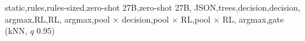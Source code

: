 {static},{rules},{rules-sized},{zero-shot 27B},{zero-shot 27B, JSON},{trees},{decision},{decision, argmax},{RL},{RL, argmax},{pool $\times$ decision},{pool $\times$ RL},{pool $\times$ RL, argmax},{gate (kNN, $q$ 0.95)}